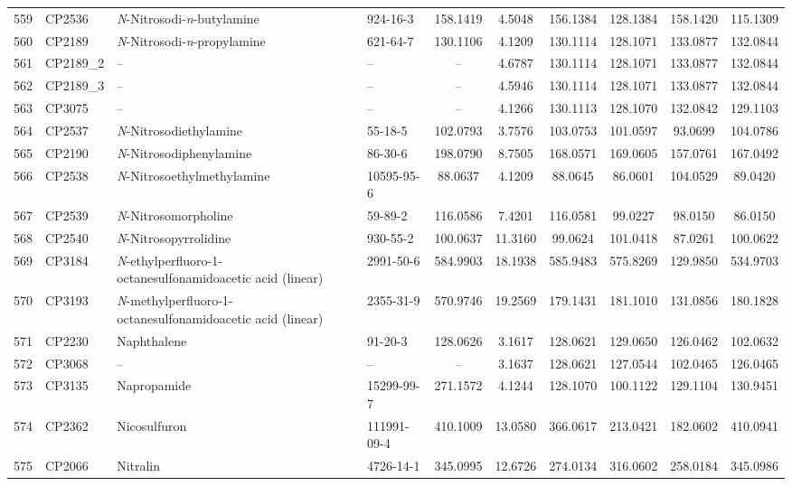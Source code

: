 \begin{longtable}{clllcccccc}
559 & CP2536 & \textit{N}-Nitrosodi-\textit{n}-butylamine & 924-16-3 & 158.1419 & 4.5048 & 156.1384 & 128.1384 & 158.1420 & 115.1309 \\ 
560 & CP2189 & \textit{N}-Nitrosodi-\textit{n}-propylamine & 621-64-7 & 130.1106 & 4.1209 & 130.1114 & 128.1071 & 133.0877 & 132.0844 \\ 
561 & CP2189\_2 & – & – & – & 4.6787 & 130.1114 & 128.1071 & 133.0877 & 132.0844 \\ 
562 & CP2189\_3 & – & – & – & 4.5946 & 130.1114 & 128.1071 & 133.0877 & 132.0844 \\ 
563 & CP3075 & – & – & – & 4.1266 & 130.1113 & 128.1070 & 132.0842 & 129.1103 \\ 
564 & CP2537 & \textit{N}-Nitrosodiethylamine & 55-18-5 & 102.0793 & 3.7576 & 103.0753 & 101.0597 & 93.0699 & 104.0786 \\ 
565 & CP2190 & \textit{N}-Nitrosodiphenylamine & 86-30-6 & 198.0790 & 8.7505 & 168.0571 & 169.0605 & 157.0761 & 167.0492 \\ 
566 & CP2538 & \textit{N}-Nitrosoethylmethylamine & 10595-95-6 & 88.0637 & 4.1209 & 88.0645 & 86.0601 & 104.0529 & 89.0420 \\ 
567 & CP2539 & \textit{N}-Nitrosomorpholine & 59-89-2 & 116.0586 & 7.4201 & 116.0581 & 99.0227 & 98.0150 & 86.0150 \\ 
568 & CP2540 & \textit{N}-Nitrosopyrrolidine & 930-55-2 & 100.0637 & 11.3160 & 99.0624 & 101.0418 & 87.0261 & 100.0622 \\ 
569 & CP3184 & \textit{N}-ethylperfluoro-1-octanesulfonamidoacetic acid (linear) & 2991-50-6 & 584.9903 & 18.1938 & 585.9483 & 575.8269 & 129.9850 & 534.9703 \\ 
570 & CP3193 & \textit{N}-methylperfluoro-1-octanesulfonamidoacetic acid (linear)\smash{\textsuperscript{\textdaggerdbl}} & 2355-31-9 & 570.9746 & 19.2569 & 179.1431 & 181.1010 & 131.0856 & 180.1828 \\ 
571 & CP2230 & Naphthalene & 91-20-3 & 128.0626 & 3.1617 & 128.0621 & 129.0650 & 126.0462 & 102.0632 \\ 
572 & CP3068 & – & – & – & 3.1637 & 128.0621 & 127.0544 & 102.0465 & 126.0465 \\ 
573 & CP3135 & Napropamide\smash{\textsuperscript{\textdaggerdbl}} & 15299-99-7 & 271.1572 & 4.1244 & 128.1070 & 100.1122 & 129.1104 & 130.9451 \\ 
574 & CP2362 & Nicosulfuron & 111991-09-4 & 410.1009 & 13.0580 & 366.0617 & 213.0421 & 182.0602 & 410.0941 \\ 
575 & CP2066 & Nitralin & 4726-14-1 & 345.0995 & 12.6726 & 274.0134 & 316.0602 & 258.0184 & 345.0986 \\ 

\end{longtable}
